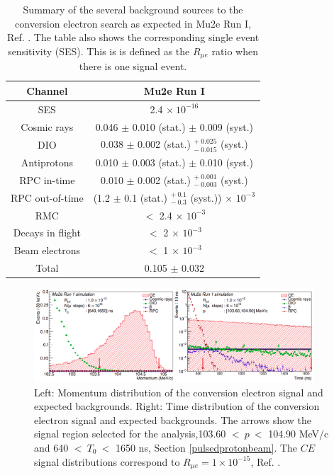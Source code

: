 \begin{center}  
\begin{table}[!h]
\centering
\renewcommand{\arraystretch}{1.2}
\begin{tabular}{| c | c |}
\hline
\textbf{Channel} & \textbf{Mu2e Run I}\\
\hline
SES & 2.4 $\times \ 10^{-16}$ \\
\hline
Cosmic rays & 0.046 $\pm$ 0.010 (stat.) $\pm$ 0.009 (syst.) \\
DIO & 0.038 $\pm$ 0.002 (stat.) $ ^{+ \ 0.025} _{- \ 0.015}$ (syst.)\\
Antiprotons & 0.010 $\pm$ 0.003 (stat.) $\pm$ 0.010 (syst.) \\
RPC in-time & 0.010 $\pm$ 0.002 (stat.) $ ^{+ \ 0.001} _{- \ 0.003}$ (syst.)\\
RPC out-of-time & (1.2 $\pm$ 0.1  (stat.) $ ^{+ \ 0.1} _{- \ 0.3}$ (syst.)) $\times$ $10^{-3}$ \\
RMC & $<$ 2.4 $\times$ $10^{-3}$ \\
Decays in flight & $<$ 2 $\times$ $10^{-3}$ \\
Beam electrons & $<$ 1 $\times$ $10^{-3}$ \\
\hline
Total &  0.105 $\pm$ 0.032\\
\hline
\end{tabular}
\caption{Summary of the several background sources to the conversion electron search as expected in Mu2e Run I,  Ref. \cite{universe9010054}. The table also shows the corresponding single event sensitivity (SES). This is is defined as the $R_{\mu e}$ ratio when there is one signal event.}
\end{table}\label{tab:summarybkg}
\end{center}
\begin{figure}[!h]
\centering
\includegraphics[width =0.93\textwidth]{images/chapter2/Screenshot_20240225_102708.png}
\caption{Left: Momentum distribution of the conversion electron signal and expected backgrounds. Right: Time distribution of the conversion electron signal and expected backgrounds. The arrows show the signal region selected for the analysis,103.60 $< \ p \ < $ 104.90 MeV/c and 640 $< \ T_0 \ < $ 1650 ns, Section \ref{pulsedprotonbeam}. The $CE$ signal distributions correspond to $R_{\mu e} = 1 \times 10^{-15}$, Ref. \cite{universe9010054}.}
\label{fig:sensitivity}
\end{figure}
